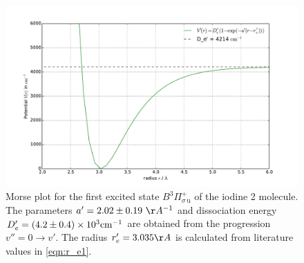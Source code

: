 \begin{figure}
    \centering
    \includegraphics[width=\pltw]{analysis/figures/morse_plot_0.pdf}
    \caption{Morse plot for the first excited state 
    $B ^3\Pi_{\sigma \, \mathrm{u}}^{+}$ of the iodine 2 molecule. 
    The parameters $a' = 2.02 \pm 0.19\ \AA^{-1}$ and dissociation energy 
    $D_e' = \left(4.2 \pm 0.4\right) \times 10^{3} \mathrm{cm^{-1}}$
    are obtained from the progression $v'' = 0 \rightarrow v'$. 
    The radius $r_e' = 3.035 \AA$ is calculated from literature values in \eqref{eqn:r_e1}. 
    }
    \label{fig:morse}
\end{figure}

